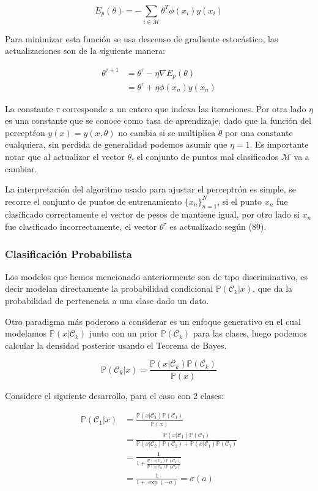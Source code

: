$$ E_p(\theta) = -\sum_{i\in\mathcal{M}}\theta^T\phi(x_i)y(x_i) $$

Para minimizar esta función se usa descenso de gradiente estocástico, las actualizaciones son de la siguiente manera:

\begin{align}
    \theta^{\tau+1} &= \theta^\tau - \eta \nabla E_p(\theta)\\
    &= \theta^\tau + \eta \phi(x_n)y(x_n)
\end{align}

La constante $\tau$ corresponde a un entero que indexa las iteraciones. Por otra lado $\eta$ es una constante que se conoce como tasa de aprendizaje, dado que la función del perceptŕon $y(x)=y(x,\theta)$ no cambia si se multiplica $\theta$ por una constante cualquiera, sin perdida de generalidad podemos asumir que $\eta=1$. Es importante notar que al actualizar el vector $\theta$, el conjunto de puntos mal clasificados $\mathcal{M}$ va a cambiar.

La interpretación del algoritmo usado para ajustar el perceptrón es simple, se recorre el conjunto de puntos de entrenamiento $\{x_n\}_{n=1}^N$, si el punto $x_n$ fue clasificado correctamente el vector de pesos de mantiene igual, por otro lado si $x_n$ fue clasificado incorrectamente, el vector $\theta^\tau$ es actualizado según (89).
\newpage
\subsubsection{Clasificación Probabilista}

Los modelos que hemos mencionado anteriormente son de tipo discriminativo, es decir modelan directamente la probabilidad condicional $\mathbb{P}(\mathcal{C}_k|x)$, que da la probabilidad de pertenencia a una clase dado un dato.

Otro paradigma más poderoso a considerar es un enfoque generativo en el cual modelamos $\mathbb{P}(x|\mathcal{C}_k)$ junto con un prior $\mathbb{P}(\mathcal{C}_k)$ para las clases, luego podemos calcular la densidad posterior usando el Teorema de Bayes.

\begin{equation}
    \mathbb{P}(\mathcal{C}_k|x) = \frac{\mathbb{P}(x|\mathcal{C}_k)\mathbb{P}(\mathcal{C}_k)}{\mathbb{P}(x)}
\end{equation}

Considere el siguiente desarrollo, para el caso con 2 clases:

\begin{align}
    \mathbb{P}(\mathcal{C}_1|x) &= \frac{\mathbb{P}(x|\mathcal{C}_1)\mathbb{P}(\mathcal{C}_1)}{\mathbb{P}(x)}\\
    &= \frac{\mathbb{P}(x|\mathcal{C}_1)\mathbb{P}(\mathcal{C}_1)}{\mathbb{P}(x|\mathcal{C}_2)\mathbb{P}(\mathcal{C}_2)+\mathbb{P}(x|\mathcal{C}_1)\mathbb{P}(\mathcal{C}_1)}\\
    &=\frac{1}{1+\frac{\mathbb{P}(x|\mathcal{C}_1)\mathbb{P}(\mathcal{C}_1)}{\mathbb{P}(x|\mathcal{C}_2)\mathbb{P}(\mathcal{C}_2)}}\\
    &=\frac{1}{1+\exp(-a)} = \sigma(a)\\
\end{align}

